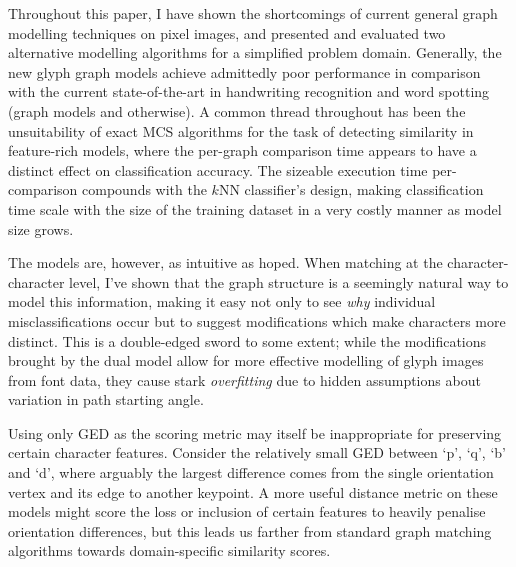 \documentclass{mpaper}
\begin{document}
Throughout this paper, I have shown the shortcomings of current general graph modelling techniques on pixel images, and presented and evaluated two alternative modelling algorithms for a simplified problem domain.
Generally, the new glyph graph models achieve admittedly poor performance in comparison with the current state-of-the-art in handwriting recognition and word spotting (graph models and otherwise).
A common thread throughout has been the unsuitability of exact MCS algorithms for the task of detecting similarity in feature-rich models, where the per-graph comparison time appears to have a distinct effect on classification accuracy.
The sizeable execution time per-comparison compounds with the $k$NN classifier's design, making classification time scale with the size of the training dataset in a very costly manner as model size grows.

The models are, however, as intuitive as hoped.
When matching at the character-character level, I've shown that the graph structure is a seemingly natural way to model this information, making it easy not only to see \emph{why} individual misclassifications occur but to suggest modifications which make characters more distinct.
This is a double-edged sword to some extent; while the modifications brought by the dual model allow for more effective modelling of glyph images from font data, they cause stark \emph{overfitting} due to hidden assumptions about variation in path starting angle.

Using only GED as the scoring metric may itself be inappropriate for preserving certain character features.
Consider the relatively small GED between `p', `q', `b' and `d', where arguably the largest difference comes from the single orientation vertex and its  edge to another keypoint.
A more useful distance metric on these models might score the loss or inclusion of certain features to heavily penalise orientation differences, but this leads us farther from standard graph matching algorithms towards domain-specific similarity scores.
\end{document}
